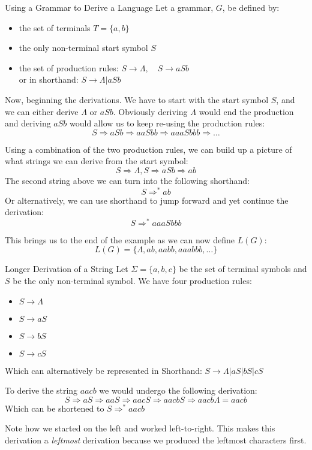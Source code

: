\begin{example}{Using a Grammar to Derive a Language}
Let a grammar, $G$, be defined by:
\begin{itemize}
    \item the set of terminals $T = \{a, b\}$
    \item the only non-terminal start symbol $S$
    \item the set of production rules: $S \rightarrow \Lambda, \quad S \rightarrow aSb$\\
    or in shorthand: $S \rightarrow \Lambda | aSb$
\end{itemize}

Now, beginning the derivations. We have to start with the start symbol $S$, and we can either derive $\Lambda$ or $aSb$. Obviously deriving $\Lambda$ would end the production and deriving $aSb$ would allow  us to keep re-using the production rules:
\[S \Rightarrow aSb \Rightarrow aaSbb \Rightarrow aaaSbbb \Rightarrow \ldots\]

Using a combination of the two production rules, we can build up a picture of what strings we can derive from the start symbol:
\[S \Rightarrow \Lambda, S \Rightarrow aSb \Rightarrow ab\]
The second string above we can turn into the following shorthand:
\[S \Rightarrow^* ab\]
Or alternatively, we can use shorthand to jump forward and yet continue the derivation:
\[S \Rightarrow^* aaaSbbb\]

This brings us to the end of the example as we can now define $L(G)$:
\[L(G) = \{\Lambda, ab, aabb, aaabbb, \ldots\}\]

\end{example}

\begin{example}{Longer Derivation of a String}
    Let $\Sigma = \{a, b, c\}$ be the set of terminal symbols and $S$ be the only non-terminal symbol. We have four production rules:
    \begin{itemize}
        \item $S \rightarrow \Lambda$
        \item $S \rightarrow aS$
        \item $S \rightarrow bS$
        \item $S \rightarrow cS$
    \end{itemize}
    Which can alternatively be represented in Shorthand: $S \rightarrow \Lambda | aS | bS | cS$

    To derive the string $aacb$ we would undergo the following derivation:
    \[S \Rightarrow aS \Rightarrow aaS \Rightarrow aacS \Rightarrow aacbS \Rightarrow aacb\Lambda = aacb\]
    Which can be shortened to $S \Rightarrow^* aacb$

    Note how we started on the left and worked left-to-right. This makes this derivation a \textit{leftmost} derivation because we produced the leftmost characters first.
\end{example}

